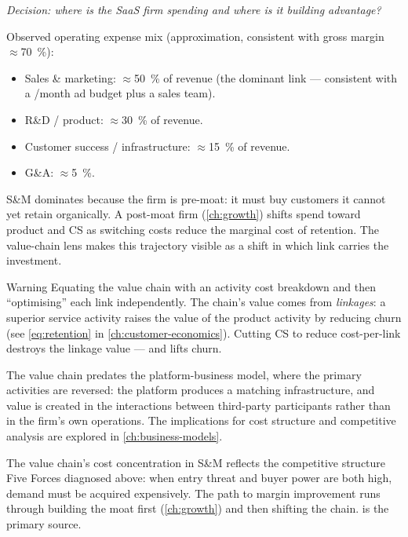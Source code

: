 \begin{example}
\emph{Decision: where is the SaaS firm spending and where is it building advantage?}

Observed operating expense mix (approximation, consistent with gross margin
$\approx$\qty{70}{\percent}):
\begin{itemize}
  \item Sales \& marketing: $\approx$\qty{50}{\percent} of revenue
        (the dominant link --- consistent with a /month ad budget
        plus a sales team).
  \item R\&D / product: $\approx$\qty{30}{\percent} of revenue.
  \item Customer success / infrastructure: $\approx$\qty{15}{\percent} of revenue.
  \item G\&A: $\approx$\qty{5}{\percent}.
\end{itemize}
S\&M dominates because the firm is pre-moat: it must buy customers it cannot yet retain
organically. A post-moat firm (\cref{ch:growth}) shifts spend toward product and CS as
switching costs reduce the marginal cost of retention. The value-chain lens makes this
trajectory visible as a shift in which link carries the investment.
\end{example}

\begin{admonition}{Warning}
Equating the value chain with an activity cost breakdown and then ``optimising'' each link
independently. The chain's value comes from \emph{linkages}: a superior service activity
raises the value of the product activity by reducing churn (see \cref{eq:retention} in
\cref{ch:customer-economics}). Cutting CS to reduce cost-per-link destroys the linkage
value --- and lifts churn.
\end{admonition}

The value chain predates the platform-business model, where the primary activities are
reversed: the platform produces a matching infrastructure, and value is created in the
interactions between third-party participants rather than in the firm's own operations.
The implications for cost structure and competitive analysis are explored in
\cref{ch:business-models}.

The value chain's cost concentration in S\&M reflects the competitive structure Five Forces
diagnosed above: when entry threat and buyer power are both high, demand must be acquired
expensively. The path to margin improvement runs through building the moat first
(\cref{ch:growth}) and then shifting the chain. \textcite{porter1985} is the primary source.

